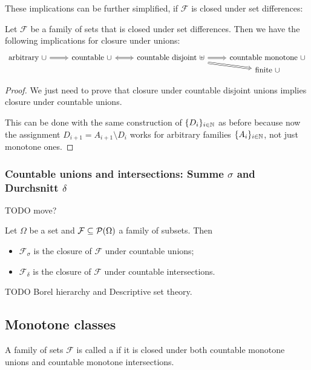 These implications can be further simplified, if $\mathcal{F}$ is closed under set differences:
\begin{lemma}
Let $\mathcal{F}$ be a family of sets that is closed under set differences. Then we have the following implications for closure under unions:
\[ \begin{tikzcd}[row sep=0em]
\text{arbitrary $\cup$} \arrow[r, Rightarrow] & \text{countable $\cup$} \arrow[r, Leftrightarrow] & \text{countable disjoint $\uplus$} \arrow[r, Rightarrow] \arrow[dr, Rightarrow] & \text{countable monotone $\cup$} \\
&&& \text{finite $\cup$}
\end{tikzcd} \]
\end{lemma}
\begin{proof}
We just need to prove that closure under countable disjoint unions implies closure under countable unions.

This can be done with the same construction of $\{D_i\}_{i\in \mathbb{N}}$ as before because now the assignment $D_{i+1} = A_{i+1}\setminus D_i$ works for arbitrary families $\{A_i\}_{i\in \mathbb{N}}$, not just monotone ones.
\end{proof}

\subsubsection{Countable unions and intersections: Summe $\sigma$ and Durchsnitt $\delta$}
TODO move?

\begin{definition}
Let $\Omega$ be a set and $\mathcal{F}\subseteq \operatorname{\mathcal{P}}(\Omega)$ a family of subsets. Then
\begin{itemize}
\item $\mathcal{F}_\sigma$ is the closure of $\mathcal{F}$ under countable unions;
\item $\mathcal{F}_\delta$ is the closure of $\mathcal{F}$ under countable intersections.
\end{itemize}
\end{definition}

TODO Borel hierarchy and Descriptive set theory.

\subsection{Monotone classes}
\begin{definition}
A family of sets $\mathcal{F}$ is called a  if it is closed under both countable monotone unions and countable monotone intersections.
\end{definition}


